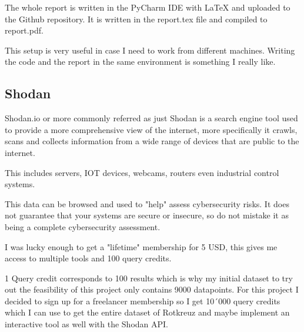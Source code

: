 \documentclass[11pt,a4paper]{article}
\begin{document}
\begin{about}
The whole report is written in the PyCharm IDE with LaTeX and uploaded to the Github repository. It is written in the
report.tex file and compiled to report.pdf.

This setup is very useful in case I need to work from different machines. Writing the code and the report in the same
environment is something I really like.

\subsection{Shodan}

Shodan.io or more commonly referred as just Shodan is a search engine tool used to provide a more comprehensive view of
the internet, more specifically it crawls, scans and collects information from a wide range of devices that are public to
the internet.

This includes servers, IOT devices, webcams, routers even industrial control systems.

This data can be browsed and used to "help" assess cybersecurity risks. It does not guarantee that your systems are secure or insecure,
so do not mistake it as being a complete cybersecurity assessment.

I was lucky enough to get a "lifetime" membership for 5 USD, this gives me access to multiple tools and 100 query credits.

1 Query credit corresponds to 100 results which is why my initial dataset to try out the feasibility of this project only
contains 9000 datapoints. For this project I decided to sign up for a freelancer membership so I get 10´000 query credits
which I can use to get the entire dataset of Rotkreuz and maybe implement an interactive tool as well with the Shodan API.

\end{about}
\newpage
\end{document}
